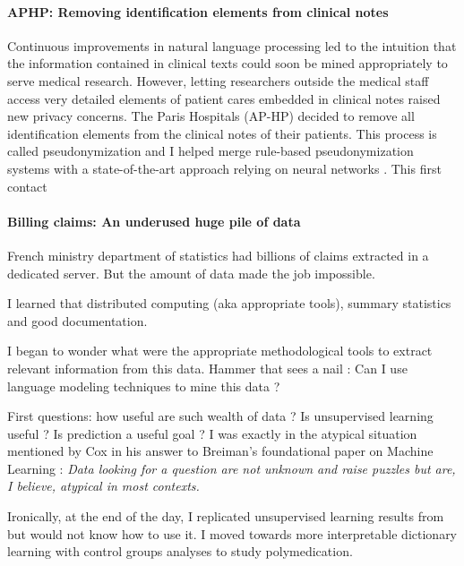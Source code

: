 \documentclass[french,12pt,twoside,a4paper]{book}
\begin{document}
%

\paragraph{APHP: Removing identification elements from clinical notes}

Continuous improvements in natural language processing led to the intuition that
the information contained in clinical texts could soon be mined appropriately to
serve medical research.
However, letting researchers outside the medical staff access very detailed
elements of patient cares embedded in clinical notes raised new privacy
concerns.
The Paris Hospitals (AP-HP) decided to remove all identification elements from
the clinical notes of their patients. This process is called pseudonymization
and I helped merge rule-based pseudonymization systems with a state-of-the-art
approach relying on neural networks \citep{dernoncourt2017identification,
  paris2019desidentification}.
This first contact

\paragraph{Billing claims: An underused huge pile of data}

French ministry department of statistics had billions of claims extracted in a
dedicated server. But the amount of data made the job impossible.

I learned that distributed computing (aka appropriate tools), summary statistics
and good documentation.

I began to wonder what were the appropriate methodological tools to extract
relevant information from this data. Hammer that sees a nail : Can I use language
modeling techniques to mine this data ?

First questions: how useful are such wealth of data ? Is unsupervised learning
useful ? Is prediction a useful goal ? I was exactly in the atypical situation
mentioned by Cox in his answer to Breiman's foundational paper on Machine
Learning \citep{breiman2001statistical} : \textit{Data looking for a question are
  not unknown and raise puzzles but are, I believe, atypical in most contexts.}

Ironically, at the end of the day, I
replicated unsupervised learning results from \citep{beam2019clinical} but would
not know how to use it. I moved towards more interpretable dictionary learning
with control groups analyses to study polymedication.
\end{document}
